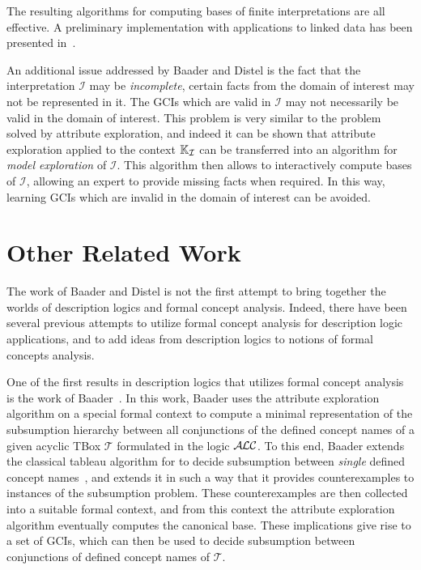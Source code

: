 The resulting algorithms for computing bases of finite interpretations are all effective.
A preliminary implementation with applications to linked data has been presented
in~\cite{DBLP:conf/icdm/BorchmannD11}.

An additional issue addressed by Baader and Distel is the fact that the interpretation
$\mathcal{I}$ may be \emph{incomplete}, \ie certain facts from the domain of interest may
not be represented in it.  The GCIs which are valid in $\mathcal{I}$ may not necessarily
be valid in the domain of interest.  This problem is very similar to the problem solved by
attribute exploration, and indeed it can be shown that attribute exploration applied to
the context ${\mathbb{K}}_{\mathcal{I}}$ can be transferred into an algorithm for \emph{model
  exploration} of $\mathcal{I}$.  This algorithm then allows to interactively compute
bases of $\mathcal{I}$, allowing an expert to provide missing facts when required.  In
this way, learning GCIs which are invalid in the domain of interest can be avoided.

\section{Other Related Work}
\label{sec:related-work}

The work of Baader and Distel is not the first attempt to bring together the worlds of
description logics and formal concept analysis.  Indeed, there have been several previous
attempts to utilize formal concept analysis for description logic applications, and to add
ideas from description logics to notions of formal concepts analysis.

One of the first results in description logics that utilizes formal concept analysis is
the work of Baader~\cite{Baader-KRUSE-95}.  In this work, Baader uses the attribute
exploration algorithm on a special formal context to compute a minimal representation of
the subsumption hierarchy between all conjunctions of the defined concept names of a given
acyclic TBox $\mathcal{T}$ formulated in the logic $\mathcal{A}\kern-0.05em\mathcal{L}\mathcal{C}$.  To this end, Baader extends
the classical tableau algorithm for \ALC to decide subsumption between \emph{single}
defined concept names~\cite{journals/ai/Schmidt-SchaussS91}, and extends it in such a way
that it provides counterexamples to instances of the subsumption problem.  These
counterexamples are then collected into a suitable formal context, and from this context
the attribute exploration algorithm eventually computes the canonical base.  These
implications give rise to a set of GCIs, which can then be used to decide subsumption
between conjunctions of defined concept names of $\mathcal{T}$.

